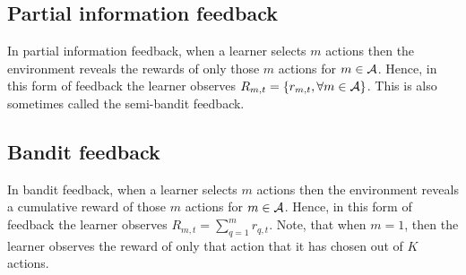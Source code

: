 \subsection{Partial information feedback}
In partial information feedback, when a learner selects $m$ actions then the environment reveals the rewards of only those $m$ actions for $m\in \mathcal{A}$. Hence, in this form of feedback  the learner observes $R_{m,t} = \lbrace r_{m,t},\forall m\in\mathcal{A}\rbrace$. This is also sometimes called the semi-bandit feedback.


\subsection{Bandit feedback}
In bandit feedback, when a learner selects $m$ actions then the environment reveals a cumulative reward of those $m$ actions for $m\in \mathcal{A}$. Hence, in this form of feedback  the learner observes $R_{m,t} = \sum_{q=1}^{m} r_{q,t}$. Note, that when $m=1$, then the learner observes the reward of only that action that it has chosen out of $K$ actions.


